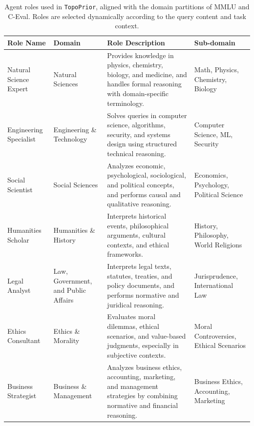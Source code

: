 \documentclass[lettersize,journal]{IEEEtran}
\theoremstyle{plain}
\begin{document}
\begin{table}[!t]
\centering
\caption{Agent roles used in \texttt{TopoPrior}, aligned with the domain partitions of MMLU and C-Eval. Roles are selected dynamically according to the query content and task context.}
\tiny
\setlength{\tabcolsep}{4pt}
\renewcommand{\arraystretch}{1.1}
\begin{tabular}{>{\centering\arraybackslash}p{}
                >{\centering\arraybackslash}p{}
                >{\arraybackslash}p{}
                >{\centering\arraybackslash}p{}}
\toprule
\textbf{Role Name} & \textbf{Domain} & \textbf{Role Description} & \textbf{Sub-domain} \\
\midrule
Natural Science Expert & Natural Sciences &
Provides knowledge in physics, chemistry, biology, and medicine, and handles formal reasoning with domain-specific terminology.
& Math, Physics, Chemistry, Biology \\

Engineering Specialist & Engineering \& Technology &
Solves queries in computer science, algorithms, security, and systems design using structured technical reasoning.
& Computer Science, ML, Security \\

Social Scientist & Social Sciences &
Analyzes economic, psychological, sociological, and political concepts, and performs causal and qualitative reasoning.
& Economics, Psychology, Political Science \\

Humanities Scholar & Humanities \& History &
Interprets historical events, philosophical arguments, cultural contexts, and ethical frameworks.
& History, Philosophy, World Religions \\

Legal Analyst & Law, Government, and Public Affairs &
Interprets legal texts, statutes, treaties, and policy documents, and performs normative and juridical reasoning.
& Jurisprudence, International Law \\

Ethics Consultant & Ethics \& Morality &
Evaluates moral dilemmas, ethical scenarios, and value-based judgments, especially in subjective contexts.
& Moral Controversies, Ethical Scenarios \\

Business Strategist & Business \& Management &
Analyzes business ethics, accounting, marketing, and management strategies by combining normative and financial reasoning.
& Business Ethics, Accounting, Marketing \\


\end{tabular}
\end{table}
\end{document}
